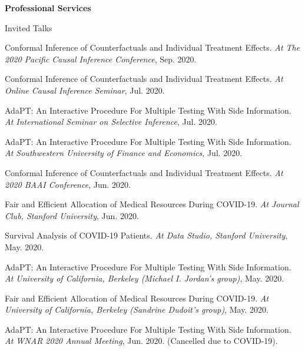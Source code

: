 \documentclass{article}
\begin{document}
\vspace{2mm}
\begin{large}
\noindent \textbf{Professional Services}
\end{large}
\vspace{5mm}

\begin{large}
\noindent Invited Talks
\end{large}

\vspace{2mm}
Conformal Inference of Counterfactuals and Individual Treatment Effects. \emph{At The 2020 Pacific Causal Inference Conference}, Sep. 2020.

\vspace{2mm}
Conformal Inference of Counterfactuals and Individual Treatment Effects. \emph{At Online Causal Inference Seminar}, Jul. 2020.

\vspace{2mm}
AdaPT: An Interactive Procedure For Multiple Testing With Side Information. \emph{At International Seminar on Selective Inference}, Jul. 2020. 

\vspace{2mm}
AdaPT: An Interactive Procedure For Multiple Testing With Side Information. \emph{At Southwestern University of Finance and Economics}, Jul. 2020. 

\vspace{2mm}
Conformal Inference of Counterfactuals and Individual Treatment Effects. \emph{At 2020 BAAI Conference}, Jun. 2020. 

\vspace{2mm}
Fair and Efficient Allocation of Medical Resources During COVID-19. \emph{At Journal Club, Stanford University}, Jun. 2020.

\vspace{2mm}
Survival Analysis of COVID-19 Patients. \emph{At Data Studio, Stanford University}, May. 2020.

\vspace{2mm}
AdaPT: An Interactive Procedure For Multiple Testing With Side Information. \emph{At University of California, Berkeley (Michael I. Jordan's group)}, May. 2020. 

\vspace{2mm}
Fair and Efficient Allocation of Medical Resources During COVID-19. \emph{At University of California, Berkeley (Sandrine Dudoit's group)}, May. 2020. 

\vspace{2mm}
AdaPT: An Interactive Procedure For Multiple Testing With Side Information. \emph{At WNAR 2020 Annual Meeting}, Jun. 2020. (Cancelled due to COVID-19).
\end{document}
